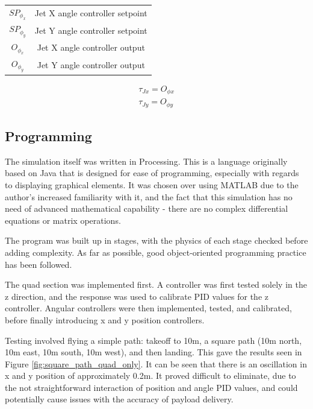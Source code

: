 \documentclass[11pt]{article}
\begin{document}
\begin{center}
\begin{tabular}{cc}
    $SP_{\phi_x}$ & Jet X angle controller setpoint \\
    $SP_{\phi_y}$ & Jet Y angle controller setpoint \\
    $O_{\phi_x}$ & Jet X angle controller output \\
    $O_{\phi_y}$ & Jet Y angle controller output \\
\end{tabular}

\begin{eqnarray}
    \tau_{Jx} = O_{\phi x} \\
    \tau_{Jy} = O_{\phi y}
\end{eqnarray}
\end{center}

\subsection{Programming}
The simulation itself was written in Processing. This is a language originally based on Java that is designed for ease of programming, especially with regards to displaying graphical elements\cite{processing}. It was chosen over using MATLAB due to the author's increased familiarity with it, and the fact that this simulation has no need of advanced mathematical capability - there are no complex differential equations or matrix operations.

The program was built up in stages, with the physics of each stage checked before adding complexity. As far as possible, good object-oriented programming practice has been followed.

The quad section was implemented first. A controller was first tested solely in the z direction, and the response was used to calibrate PID values for the z controller. Angular controllers were then implemented, tested, and calibrated, before finally introducing x and y position controllers.

Testing involved flying a simple path: takeoff to 10m, a square path (10m north, 10m east, 10m south, 10m west), and then landing. This gave the results seen in Figure \ref{fig:square_path_quad_only}. It can be seen that there is an oscillation in x and y position of approximately 0.2m. It proved difficult to eliminate, due to the not straightforward interaction of position and angle PID values, and could potentially cause issues with the accuracy of payload delivery.
\end{document}
